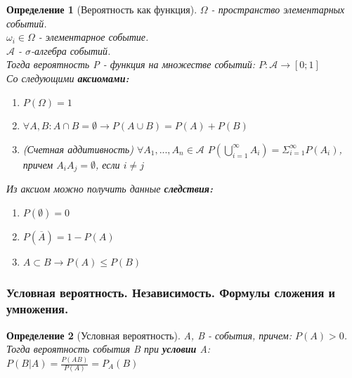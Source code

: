 \documentclass[14pt]{extarticle}
\theoremstyle{breakstyle}
\newtheorem{definition}{Определение}[subsection]
\begin{document}
\begin{definition}[Вероятность как функция]
$\Omega$ - пространство элементарных событий. \\
$\omega_i \in \Omega$ - элементарное событие. \\
$\mathscr{A}$ - $\sigma$-алгебра событий. \\

Тогда вероятность P - функция на множестве событий:
$P: \mathscr{A} \rightarrow [0; 1]$ \\

Со следующими \textbf{аксиомами:}
\begin{enumerate}[noitemsep, topsep=0pt]
    \item $P(\Omega) = 1$
    \item $\forall A, B: A \cap B = \emptyset \rightarrow P(A \cup B) = P(A) + P(B)$
    \item (Счетная аддитивность) $\forall A_1, ... , A_n \in \mathscr{A}$ $P(\bigcup_{i=1}^{\infty} A_i) = \Sigma_{i=1}^{\infty}P(A_i)$, причем $A_{i}A_{j} = \emptyset$, если $i \neq j$
\end{enumerate}

\vspace{1em}

Из аксиом можно получить данные \textbf{следствия:}
\begin{enumerate}[noitemsep, topsep=0pt]
    \item $P(\emptyset) = 0$
    \item $P(\overline{A}) = 1 - P(A)$
    \item $A \subset B \rightarrow P(A) \leq P(B)$
\end{enumerate}

\end{definition}

\subsubsection{Условная вероятность. Независимость. Формулы сложения и умножения.}
\begin{definition}[Условная вероятность]

A, B - события, причем: $P(A) > 0$. \\
Тогда вероятность события B при \textbf{условии} A: \\
$P(B | A) = \frac{P(AB)}{P(A)} = P_{A}(B)$

\end{definition}
\end{document}
